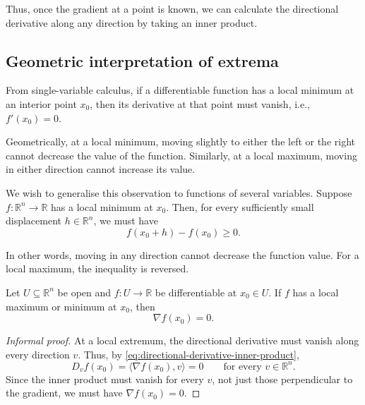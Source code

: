 Thus, once the gradient at a point is known, we can calculate the directional derivative along any direction by taking an inner product.



\subsection{Geometric interpretation of extrema}

From single-variable calculus, if a differentiable function has a local minimum at an interior point $x_0$, then its derivative at that point must vanish, i.e., \( f'(x_0)=0 \).

Geometrically, at a local minimum, moving slightly to either the left or the right cannot decrease the value of the function. Similarly, at a local maximum, moving in either direction cannot increase its value.


We wish to generalise this observation to functions of several variables. Suppose $f:\mathbb{R}^n\to\mathbb{R}$ has a local minimum at $x_0$. Then, for every sufficiently small displacement $h\in\mathbb{R}^n$, we must have
\begin{equation}
	f(x_0+h)-f(x_0)\geq 0.
	\label{eq:local-minimum-condition}
\end{equation}

In other words, moving in any direction cannot decrease the function value. For a local maximum, the inequality is reversed.


\begin{proposition}
	Let $U\subseteq\mathbb{R}^n$ be open and $f:U\to\mathbb{R}$ be differentiable at $x_0\in U$. If $f$ has a local maximum or minimum at $x_0$, then
	\begin{equation}
		\nabla f(x_0)=0.
		\label{eq:necessary-condition-extremum}
	\end{equation}
\end{proposition}

\begin{proof}[Informal proof]
	At a local extremum, the directional derivative must vanish along every direction $v$. Thus, by \autoref{eq:directional-derivative-inner-product},
	\[
		D_vf(x_0)=\langle\nabla f(x_0),v\rangle=0
		\qquad\text{for every }v\in\mathbb{R}^n.
	\]
	Since the inner product must vanish for every $v$, not just those perpendicular to the gradient, we must have $\nabla f(x_0)=0$.
\end{proof}

